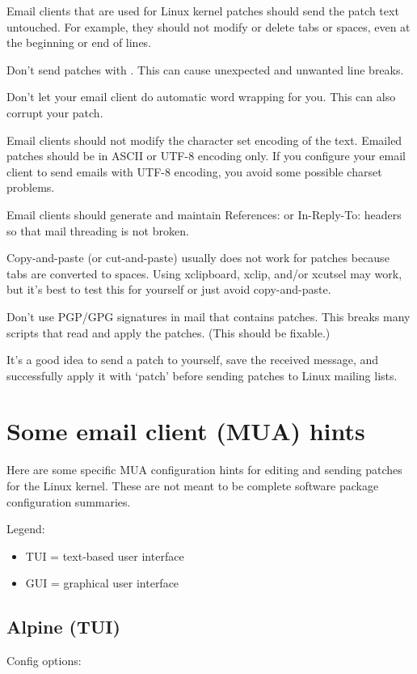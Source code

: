 \documentclass[a4paper,8pt,english]{sphinxmanual}
\begin{document}
Email clients that are used for Linux kernel patches should send the
patch text untouched.  For example, they should not modify or delete tabs
or spaces, even at the beginning or end of lines.

Don't send patches with .  This can cause unexpected
and unwanted line breaks.

Don't let your email client do automatic word wrapping for you.
This can also corrupt your patch.

Email clients should not modify the character set encoding of the text.
Emailed patches should be in ASCII or UTF-8 encoding only.
If you configure your email client to send emails with UTF-8 encoding,
you avoid some possible charset problems.

Email clients should generate and maintain References: or In-Reply-To:
headers so that mail threading is not broken.

Copy-and-paste (or cut-and-paste) usually does not work for patches
because tabs are converted to spaces.  Using xclipboard, xclip, and/or
xcutsel may work, but it's best to test this for yourself or just avoid
copy-and-paste.

Don't use PGP/GPG signatures in mail that contains patches.
This breaks many scripts that read and apply the patches.
(This should be fixable.)

It's a good idea to send a patch to yourself, save the received message,
and successfully apply it with `patch' before sending patches to Linux
mailing lists.


\section{Some email client (MUA) hints}
\label{process/email-clients:some-email-client-mua-hints}
Here are some specific MUA configuration hints for editing and sending
patches for the Linux kernel.  These are not meant to be complete
software package configuration summaries.

Legend:
\begin{itemize}
\item {} 
TUI = text-based user interface

\item {} 
GUI = graphical user interface

\end{itemize}


\subsection{Alpine (TUI)}
\label{process/email-clients:alpine-tui}
Config options:
\end{document}
